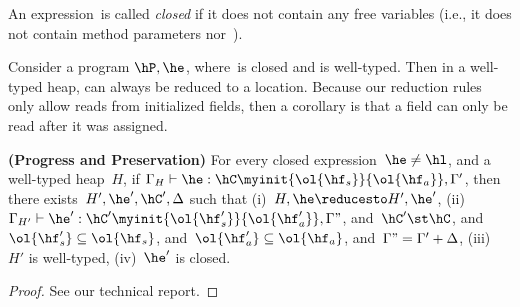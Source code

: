 An expression~\he is called \emph{closed} if it does not contain
    any free variables (i.e., it does not contain method parameters \hx nor~\this).


Consider a program $\hP,\he$, where~\he is closed and \hP is well-typed.
Then in a well-typed heap, \he can always be reduced to a location.
Because our reduction rules only allow reads from initialized fields,
    then a corollary is that a field can only be read after it was assigned.


\begin{Theorem}[preservation]
  \textbf{(Progress and Preservation)}
    For every closed expression~$\he \neq \hl$, and a well-typed heap~$H$,
        if $\Gamma_{H} \vdash \he : \hC\myinit{\ol{\hf_s}}{\ol{\hf_a}}, \Gamma'$,
        then there exists~$H',\he',\hC',\Delta$ such that
        (i)~$H,\he \reducesto H',\he'$,
        (ii)~$\Gamma_{H'} \vdash \he':\hC'\myinit{\ol{\hf'_s}}{\ol{\hf'_a}}, \Gamma"$,
        and~$\hC' \st \hC$,
        and~$\ol{\hf'_s} \subseteq \ol{\hf_s}$,
        and~$\ol{\hf'_a} \subseteq \ol{\hf_a}$,
        and~$\Gamma" = \Gamma'+\Delta$,
        (iii)~$H'$ is well-typed,
        (iv)~$\he'$ is closed.
\end{Theorem}
\begin{proof}
See our technical report.
\end{proof}
